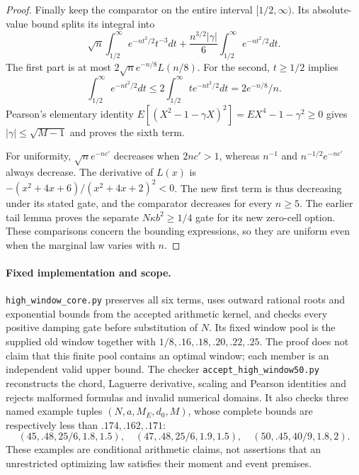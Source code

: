 \begin{proof}
Finally keep the comparator on the entire interval $[1/2,\infty)$.
Its absolute-value bound splits its integral into
\[
 \sqrt n\int_{1/2}^{\infty}e^{-nt^2/2}t^{-3}dt
 +\frac{n^{3/2}|\gamma|}{6}
                 \int_{1/2}^{\infty}e^{-nt^2/2}dt.
\]
The first part is at most $2\sqrt n e^{-n/8}L(n/8)$.
For the second, $t\ge1/2$ implies
\[
 \int_{1/2}^{\infty}e^{-nt^2/2}dt
 \le2\int_{1/2}^{\infty}t e^{-nt^2/2}dt
 =2e^{-n/8}/n.
\]
Pearson's elementary identity
$E[(X^2-1-\gamma X)^2]=EX^4-1-\gamma^2\ge0$
gives $|\gamma|\le\sqrt{M-1}$ and proves the sixth term.

For uniformity, $\sqrt n e^{-nc'}$ decreases when $2nc'>1$,
whereas $n^{-1}$ and $n^{-1/2}e^{-nc'}$ always decrease.
The derivative of $L(x)$ is
$-(x^2+4x+6)/(x^2+4x+2)^2<0$.
The new first term is thus decreasing under its stated gate, and the
comparator decreases for every $n\ge5$. The earlier tail lemma proves
the separate $N\kappa b^2\ge1/4$ gate for its new zero-cell option.
These comparisons concern the bounding expressions, so they are uniform
even when the marginal law varies with $n$.
\end{proof}

\paragraph{Fixed implementation and scope.}
\texttt{high\_window\_core.py} preserves all six terms, uses outward rational
roots and exponential bounds from the accepted arithmetic kernel, and checks
every positive damping gate before substitution of $N$. Its fixed window
pool is the supplied old window together with
$1/8,.16,.18,.20,.22,.25$. The proof does not claim that this finite pool
contains an optimal window; each member is an independent valid upper bound.
The checker \texttt{accept\_high\_window50.py} reconstructs the chord,
Laguerre derivative, scaling and Pearson identities and rejects malformed
formulas and invalid numerical domains. It also checks three named example
tuples $(N,a,M_E,d_0,M)$, whose complete bounds are respectively
less than $.174,.162,.171$:
\[
 (45,.48,25/6,1.8,1.5),\quad
 (47,.48,25/6,1.9,1.5),\quad
 (50,.45,40/9,1.8,2).
\]
These examples are conditional arithmetic claims, not assertions that an
unrestricted optimizing law satisfies their moment and event premises.
